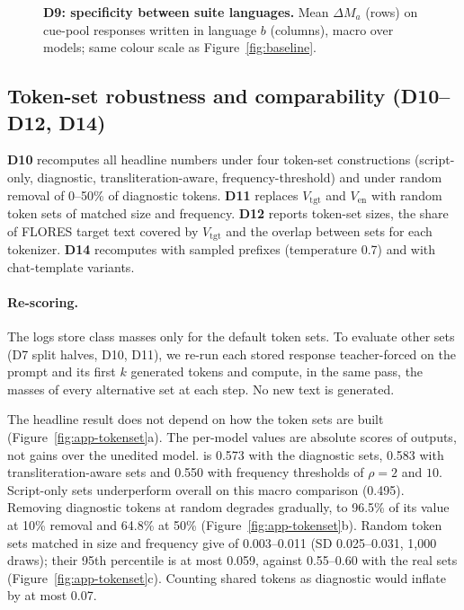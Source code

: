 \begin{figure}[!htbp]
  \centering
  \caption{\textbf{D9: specificity between suite languages.} Mean $\Delta M_a$ (rows) on cue-pool responses written in language $b$ (columns), macro over models; same colour scale as Figure~\ref{fig:baseline}.}
  \label{fig:app-specificity}
\end{figure}

\FloatBarrier
\subsection{Token-set robustness and comparability (D10--D12, D14)}

\textbf{D10} recomputes all headline numbers under four token-set constructions (script-only, diagnostic, transliteration-aware, frequency-threshold) and under random removal of 0--50\% of diagnostic tokens. \textbf{D11} replaces $V_{\mathrm{tgt}}$ and $V_{\mathrm{en}}$ with random token sets of matched size and frequency. \textbf{D12} reports token-set sizes, the share of FLORES target text covered by $V_{\mathrm{tgt}}$ and the overlap between sets for each tokenizer. \textbf{D14} recomputes \dM with sampled prefixes (temperature 0.7) and with chat-template variants.

\paragraph{Re-scoring.} The logs store class masses only for the default token sets. To evaluate other sets (D7 split halves, D10, D11), we re-run each stored response teacher-forced on the prompt and its first $k$ generated tokens and compute, in the same pass, the masses of every alternative set at each step. No new text is generated.

The headline result does not depend on how the token sets are built (Figure~\ref{fig:app-tokenset}a). The per-model values are absolute  scores of \foxp outputs, not gains over the unedited model.  is 0.573 with the diagnostic sets, 0.583 with transliteration-aware sets and 0.550 with frequency thresholds of $\rho=2$ and $10$. Script-only sets underperform overall on this macro comparison (0.495). Removing diagnostic tokens at random degrades  gradually, to 96.5\% of its value at 10\% removal and 64.8\% at 50\% (Figure~\ref{fig:app-tokenset}b). Random token sets matched in size and frequency give  of 0.003--0.011 (SD 0.025--0.031, 1{,}000 draws); their 95th percentile is at most 0.059, against 0.55--0.60 with the real sets (Figure~\ref{fig:app-tokenset}c). Counting shared tokens as diagnostic would inflate \dM by at most 0.07.

